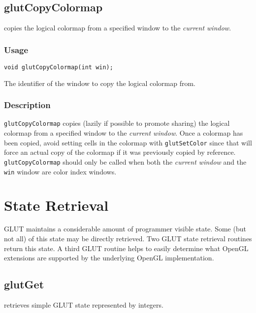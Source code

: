 \subsection{glutCopyColormap}

 copies the logical
colormap from a specified window to the {\em current window}.

\subsubsection*{Usage}
\begin{verbatim}
void glutCopyColormap(int win);
\end{verbatim}
\begin{description}
\itemsep 0in
\item[\tt win]
The identifier of the window to copy the logical colormap from.
\end{description}

\subsubsection*{Description}

{\tt glutCopyColormap} copies (lazily if possible to promote sharing) the logical
colormap from a specified window to the {\em current window}.  Once a colormap has been
copied, avoid setting cells in the colormap with {\tt glutSetColor} since that
will force an actual copy of the colormap if it was previously copied by reference.
{\tt glutCopyColormap} should only be called when both the {\em current window} and
the {\tt win} window are color index windows.

\section{State Retrieval}

GLUT maintains a considerable amount of programmer visible state.
Some (but not all) of this state may be directly retrieved.
Two GLUT state retrieval routines return this state.
A third GLUT routine helps to easily determine what OpenGL extensions are
supported by the underlying OpenGL implementation.

\subsection{glutGet}

 retrieves simple GLUT state represented by integers.

